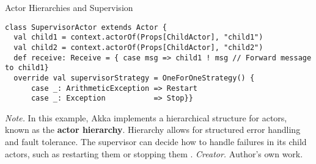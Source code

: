 \begin{table}[H]
\caption{Actor Hierarchies and Supervision}
\begin{lstlisting}
class SupervisorActor extends Actor {
  val child1 = context.actorOf(Props[ChildActor], "child1")
  val child2 = context.actorOf(Props[ChildActor], "child2")
  def receive: Receive = { case msg => child1 ! msg // Forward message to child1}
  override val supervisorStrategy = OneForOneStrategy() {
      case _: ArithmeticException => Restart
      case _: Exception           => Stop}}
\end{lstlisting}
\small
\textit{Note.} In this example, Akka implements a hierarchical structure for actors, known as the \textbf{actor hierarchy}. Hierarchy allows for structured error handling and fault tolerance. The supervisor can decide how to handle failures in its child actors, such as restarting them or stopping them .
\textit{Creator.} Author's own work.
\end{table}
